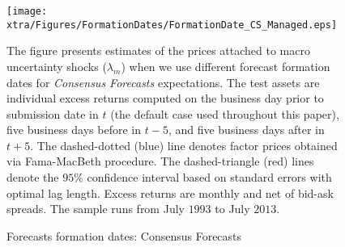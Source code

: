 \begin{landscape}
	\begin{figure}
		\begin{center}
			\texttt{[image: xtra/Figures/FormationDates/FormationDate\_CS\_Managed.eps]}
		\end{center}
		\vspace{4cm}
		
		\caption{Forecasts formation dates: Consensus Forecasts} \label{fig:formation_dates_CS_managed} \smallskip
		\begin{footnotesize}
			The figure presents estimates of the prices attached to macro uncertainty shocks ($\lambda_{m}$) when we use different forecast formation dates for \emph{Consensus Forecasts} expectations. The test assets are individual excess returns computed on the business day prior to submission date in $t$ (the default case used throughout this paper), five business days before in $t-5$, and five business days after in $t+5$. The dashed-dotted (blue) line denotes factor prices obtained via Fama-MacBeth procedure. The dashed-triangle (red) lines denote the $95\%$ confidence interval based on \citet{newey_west1987} standard errors with \citet{andrews1991} optimal lag length. Excess returns are monthly and net of bid-ask spreads. The sample runs from July $1993$ to July $2013$.
		\end{footnotesize}
	\end{figure}
\end{landscape}

\newpage
\clearpage

